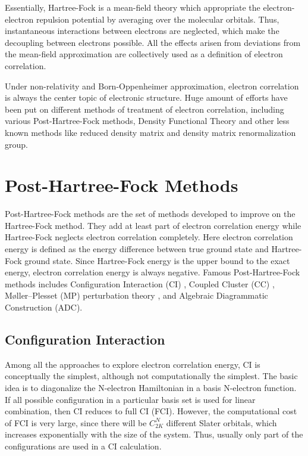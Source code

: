 Essentially, Hartree-Fock is a mean-field theory which appropriate the electron-electron repulsion potential by averaging over the molecular orbitals.
Thus, instantaneous interactions between electrons are neglected, which make the decoupling between electrons possible.
All the effects arisen from deviations from the mean-field approximation are collectively used as a definition of electron correlation.

Under non-relativity and Born-Oppenheimer approximation, electron correlation is always the center topic of electronic structure.
Huge amount of efforts have been put on different methods of treatment of electron correlation,
including various Post-Hartree-Fock methods, Density Functional Theory and other less known methods like reduced density matrix \cite{reduceddm} and density matrix renormalization group. \cite{dmrg}

\section{Post-Hartree-Fock Methods}
Post-Hartree-Fock methods are the set of methods developed to improve on the Hartree-Fock method. They add at least part of electron correlation energy while Hartree-Fock neglects electron correlation completely.
Here electron correlation energy is defined as the energy difference between true ground state and Hartree-Fock ground state. Since Hartree-Fock energy is the upper bound to the exact energy, electron correlation energy is always negative.
Famous Post-Hartree-Fock methods includes Configuration Interaction (CI) \cite{mqc}, Coupled Cluster (CC) \cite{coupledcluster}, M{\o}ller–Plesset (MP) perturbation theory \cite{mp2}, and Algebraic Diagrammatic Construction (ADC).

\subsection{Configuration Interaction}
Among all the approaches to explore electron correlation energy, CI is conceptually the simplest, although not computationally the simplest.
The basic idea is to diagonalize the N-electron Hamiltonian in a basis N-electron function.
If all possible configuration in a particular basis set is used for linear combination, then CI reduces to full CI (FCI).
However, the computational cost of FCI is very large, since there will be $C_{2K}^{N}$ different Slater orbitals, which increases exponentially with the size of the system.
Thus, usually only part of the configurations are used in a CI calculation.

